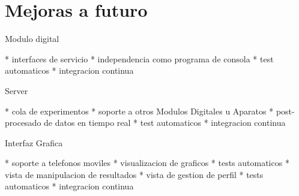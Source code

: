 \section{Mejoras a futuro}




Modulo digital

* interfaces de servicio
* independencia como programa de consola
* test automaticos
* integracion continua

Server

* cola de experimentos
* soporte a otros Modulos Digitales u Aparatos
* post-procesado de datos en tiempo real
* test automaticos
* integracion continua

Interfaz Grafica

* soporte a telefonos moviles
* visualizacion de graficos
* tests automaticos
* vista de manipulacion de resultados
* vista de gestion de perfil
* tests automaticos
* integracion continua

\newpage